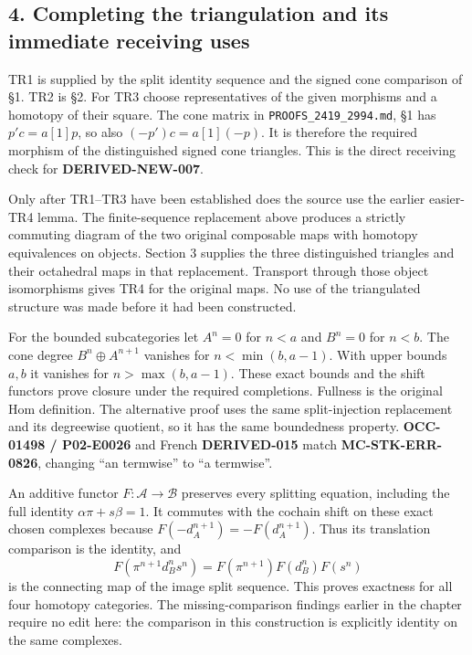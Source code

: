\subsection{4. Completing the triangulation and its immediate receiving uses}\label{proofs-2995-3485-completing-the-triangulation-and-its-immediate-receiving-uses}

TR1 is supplied by the split identity sequence and the signed cone comparison of §1. TR2 is §2. For TR3 choose representatives of the given morphisms and a homotopy of their square. The cone matrix in \texttt{PROOFS\_\allowbreak{}2419\_\allowbreak{}2994.\allowbreak{}md},\allowbreak{} §1 has \(p'c=a[1]p\),\allowbreak{} so also \((-p')c=a[1](-p)\). It is therefore the required morphism of the distinguished signed cone triangles. This is the direct receiving check for \textbf{DERIVED-NEW-007}.

Only after TR1–\allowbreak{}TR3 have been established does the source use the earlier easier-TR4 lemma. The finite-sequence replacement above produces a strictly commuting diagram of the two original composable maps with homotopy equivalences on objects. Section 3 supplies the three distinguished triangles and their octahedral maps in that replacement. Transport through those object isomorphisms gives TR4 for the original maps. No use of the triangulated structure was made before it had been constructed.

For the bounded subcategories let \(A^n=0\) for \(n<a\) and \(B^n=0\) for \(n<b\). The cone degree \(B^n\oplus A^{n+1}\) vanishes for \(n<\min(b,a-1)\). With upper bounds \(a,b\) it vanishes for \(n>\max(b,a-1)\). These exact bounds and the shift functors prove closure under the required completions. Fullness is the original Hom definition. The alternative proof uses the same split-injection replacement and its degreewise quotient,\allowbreak{} so it has the same boundedness property. \textbf{OCC-01498 /\allowbreak{} P02-E0026} and French \textbf{DERIVED-015} match \textbf{MC-STK-ERR-0826},\allowbreak{} changing ``an termwise'' to ``a termwise''.

An additive functor \(F:\mathcal A\to\mathcal B\) preserves every splitting equation,\allowbreak{} including the full identity \(\alpha\pi+s\beta=1\). It commutes with the cochain shift on these exact chosen complexes because \(F(-d_A^{n+1})=-F(d_A^{n+1})\). Thus its translation comparison is the identity,\allowbreak{} and \[
F(\pi^{n+1}d_B^ns^n)=F(\pi^{n+1})F(d_B^n)F(s^n)
\] is the connecting map of the image split sequence. This proves exactness for all four homotopy categories. The missing-comparison findings earlier in the chapter require no edit here:\allowbreak{} the comparison in this construction is explicitly identity on the same complexes.

